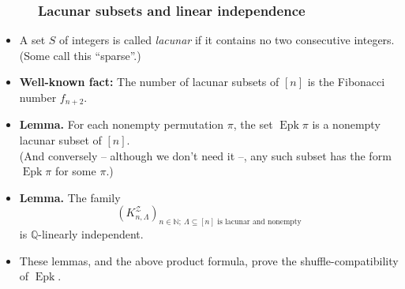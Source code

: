 \documentclass{beamer}
\newcommand{\Epk}{\operatorname{Epk}}
\newcommand{\fti}[1]{\frametitle{\ \ \ \ \ #1}}
\newcommand{\ive}[1]{\left[ #1 \right]}
\newcommand{\defn}[1]{{\color{darkred}\emph{#1}}} %
\theoremstyle{plain}
\begin{document}
\begin{frame}
\fti{Lacunar subsets and linear independence}

\begin{itemize}

\item A set $S$ of integers is called \defn{lacunar} if it contains
      no two consecutive integers. (Some call this ``sparse''.)

\item \textbf{Well-known fact:} The number of lacunar subsets of
      $\ive{n}$ is the Fibonacci number $f_{n+2}$.

\pause

\item \textbf{Lemma.}
      For each nonempty permutation $\pi$, the set $\Epk \pi$ is a nonempty
      lacunar subset of $\ive{n}$. \\
      (And conversely -- although we don't need it --,
      any such subset has the form $\Epk \pi$ for some $\pi$.)

\pause

\item \textbf{Lemma.}
      The family
        \[
        \left(  K_{n,\Lambda}^{\mathcal{Z}}\right)  _{n\in\mathbb{N};\ \Lambda
        \subseteq\left[  n\right]  \text{ is lacunar and nonempty}}%
        \]
        is $\mathbb{Q}$-linearly independent.

\item These lemmas, and the above product formula, prove the
      shuffle-compatibility of $\Epk$.

\end{itemize}

\end{frame}
\end{document}

